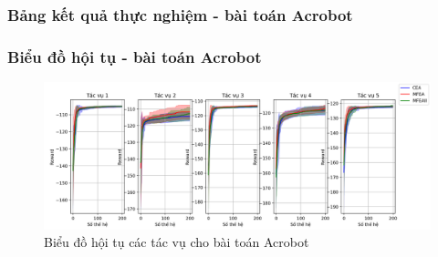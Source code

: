 \subsubsection{Bảng kết quả thực nghiệm - bài toán Acrobot}
\begin{table} [H]
    \begin{center}
    \caption{Kết quả huấn luyện các tác vụ cho bài toán Acrobot}

    \end{center}
    \label{tab:result:acrobot}
\end{table}


\subsubsection{Biểu đồ hội tụ - bài toán Acrobot}
\begin{figure}[h!]
    \centering
    \includegraphics[width=\textwidth,height=\textheight,keepaspectratio]{thesis/images/results/rl/acrobot_conv.png}
    \caption{Biểu đồ hội tụ các tác vụ cho bài toán Acrobot}
    \label{fig:Acrobot_conv}
\end{figure}

